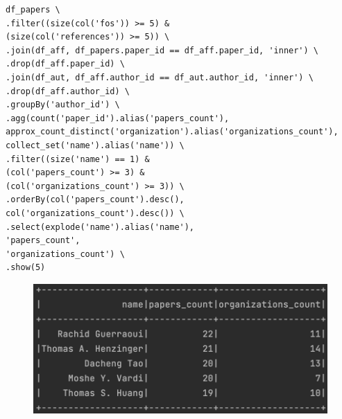 \begin{enumerate}
\begin{lstlisting}[label={lst:query10spark}]
df_papers \
.filter((size(col('fos')) >= 5) &
(size(col('references')) >= 5)) \
.join(df_aff, df_papers.paper_id == df_aff.paper_id, 'inner') \
.drop(df_aff.paper_id) \
.join(df_aut, df_aff.author_id == df_aut.author_id, 'inner') \
.drop(df_aff.author_id) \
.groupBy('author_id') \
.agg(count('paper_id').alias('papers_count'),
approx_count_distinct('organization').alias('organizations_count'),
collect_set('name').alias('name')) \
.filter((size('name') == 1) &
(col('papers_count') >= 3) &
(col('organizations_count') >= 3)) \
.orderBy(col('papers_count').desc(),
col('organizations_count').desc()) \
.select(explode('name').alias('name'),
'papers_count',
'organizations_count') \
.show(5)
    \end{lstlisting}
    \begin{figure}[H]
        \begin{center}
            \includegraphics[width=0.9\linewidth]{ImagesSpark/query10spark}
            \label{fig:query10spark}%
        \end{center}
    \end{figure}
\end{enumerate}
